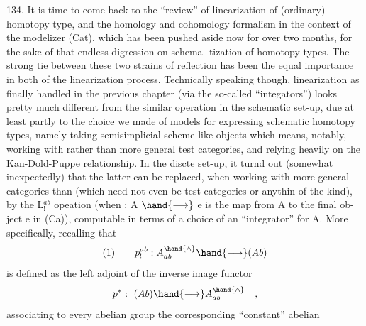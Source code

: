 134.  It is time to come back to the ``review'' of linearization of
(ordinary) homotopy type,  and the homology and cohomology formalism
in the context of the modelizer (Cat),  which has been pushed aside now
for over two months,  for the sake of that endless digression on schema-%
tization of homotopy types.\hand{\unsure{*}}  The strong tie between these two strains
of reflection has been the equal importance in both of the linearization
process.  Technically speaking though,  linearization\hand{,} as finally handled
in the previous chapter (via the so-called ``integators'')\hand{,} looks pretty
much different from the similar operation in the schematic set-up,  due
\hand{(}at least partly\hand{)} to the choice we made of models for expressing schematic
homotopy types,  namely taking semisimplicial scheme-like objects\over{,}{;}
which means,  notably,  working with \hand{$\Delta$} rather than more general test
categories,  and relying heavily on the Kan-Dold-Puppe relationship.
In the discte set-up,  it turnd out (somewhat inexpectedly) that the
latter can be replaced,  when working with more general categories  than
\hand{$\Delta$} (which need not even be test categories or anythin of the kind),  by
the L$^{ab}_{!}$ opeation (when  : A $\hand{\longrightarrow}$ e is the map from A to the final ob-%
ject e in (Ca)),  computable  in terms of a choice of an ``integrator''
for A.  More specifically,  recalling that
\[ (1) \qquad p^{ab}_{!} : A^{\hand{\wedge}}_{ab} \hand{\longrightarrow} (Ab) \]
is defined as the left adjoint of the  inverse image functor
\[ p^{*}: \ (Ab) \hand{\longrightarrow} A^{\hand{\wedge}}_{ab} \quad , \]
associating to every abelian group the corresponding ``constant'' abelian

